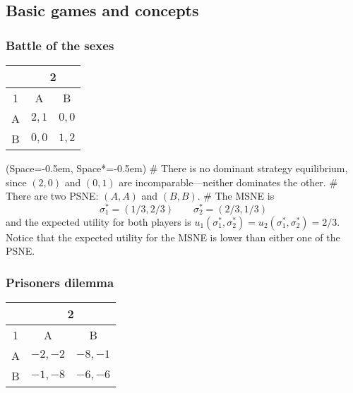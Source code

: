 \documentclass[12pt, a4paper]{article}
\newcommand{\listSpace}{-0.5em}%
\begin{document}
\subsection{Basic games and concepts}

\subsubsection*{Battle of the sexes}
\begin{table}[ht!]
	\centering
	\begin{tabular}{|c|c|c|} \hline
		& \multicolumn{2}{|c|}{2} \\ \hline
		1 & A & B \\ \hline
		A & $2, 1$ & $0,0$ \\ \hline
		B & $0,0$ & $1,2$ \\ \hline
	\end{tabular}
\end{table}

\begin{easylist}[itemize]
	\ListProperties(Space=\listSpace, Space*=\listSpace)
	# There is no dominant strategy equilibrium, since $(2, 0)$ and $(0, 1)$ are incomparable---neither dominates the other.
	# There are two PSNE: $(A, A)$ and $(B, B)$.
	# The MSNE is
	\begin{equation*}
		\sigma_1^* = ( 1/3, 2/3) \qquad
		\sigma_2^* = ( 2/3, 1/3)
	\end{equation*}
	and the expected utility for both players is $u_1(\sigma_1^*, \sigma_2^*) = u_2(\sigma_1^*, \sigma_2^*) = 2/3$.
	Notice that the expected utility for the MSNE is lower than either one of the PSNE.
\end{easylist}

\subsubsection*{Prisoners dilemma}
\begin{table}[ht!]
	\centering
	\begin{tabular}{|c|c|c|} \hline
		& \multicolumn{2}{|c|}{2} \\ \hline
		1 & A & B \\ \hline
		A & $-2, -2$ & $-8, -1$ \\ \hline
		B & $-1, -8$ & $-6, -6$ \\ \hline
	\end{tabular}
\end{table}
\end{document}

